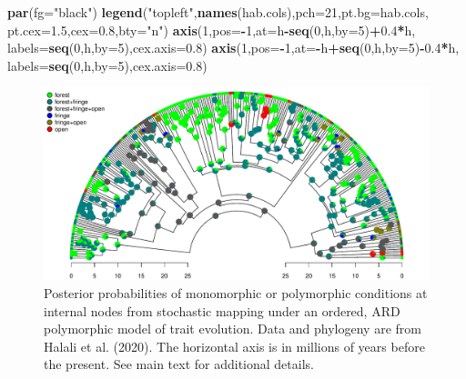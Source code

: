 \documentclass[fleqn,10pt,lineno]{wlpeerj} %
\newenvironment{Shaded}{\begin{snugshade}}{\end{snugshade}}
\newcommand{\AttributeTok}[1]{\textcolor[rgb]{0.13,0.29,0.53}{#1}}
\newcommand{\DecValTok}[1]{\textcolor[rgb]{0.00,0.00,0.81}{#1}}
\newcommand{\FloatTok}[1]{\textcolor[rgb]{0.00,0.00,0.81}{#1}}
\newcommand{\FunctionTok}[1]{\textcolor[rgb]{0.13,0.29,0.53}{\textbf{#1}}}
\newcommand{\NormalTok}[1]{#1}
\newcommand{\SpecialCharTok}[1]{\textcolor[rgb]{0.81,0.36,0.00}{\textbf{#1}}}
\newcommand{\StringTok}[1]{\textcolor[rgb]{0.31,0.60,0.02}{#1}}
\begin{document}
\begin{Shaded}
\begin{Highlighting}[]
\FunctionTok{par}\NormalTok{(}\AttributeTok{fg=}\StringTok{"black"}\NormalTok{)}
\FunctionTok{legend}\NormalTok{(}\StringTok{"topleft"}\NormalTok{,}\FunctionTok{names}\NormalTok{(hab.cols),}\AttributeTok{pch=}\DecValTok{21}\NormalTok{,}\AttributeTok{pt.bg=}\NormalTok{hab.cols,}
  \AttributeTok{pt.cex=}\FloatTok{1.5}\NormalTok{,}\AttributeTok{cex=}\FloatTok{0.8}\NormalTok{,}\AttributeTok{bty=}\StringTok{"n"}\NormalTok{)}
\FunctionTok{axis}\NormalTok{(}\DecValTok{1}\NormalTok{,}\AttributeTok{pos=}\SpecialCharTok{{-}}\DecValTok{1}\NormalTok{,}\AttributeTok{at=}\NormalTok{h}\SpecialCharTok{{-}}\FunctionTok{seq}\NormalTok{(}\DecValTok{0}\NormalTok{,h,}\AttributeTok{by=}\DecValTok{5}\NormalTok{)}\SpecialCharTok{+}\FloatTok{0.4}\SpecialCharTok{*}\NormalTok{h,}
  \AttributeTok{labels=}\FunctionTok{seq}\NormalTok{(}\DecValTok{0}\NormalTok{,h,}\AttributeTok{by=}\DecValTok{5}\NormalTok{),}\AttributeTok{cex.axis=}\FloatTok{0.8}\NormalTok{)}
\FunctionTok{axis}\NormalTok{(}\DecValTok{1}\NormalTok{,}\AttributeTok{pos=}\SpecialCharTok{{-}}\DecValTok{1}\NormalTok{,}\AttributeTok{at=}\SpecialCharTok{{-}}\NormalTok{h}\SpecialCharTok{+}\FunctionTok{seq}\NormalTok{(}\DecValTok{0}\NormalTok{,h,}\AttributeTok{by=}\DecValTok{5}\NormalTok{)}\SpecialCharTok{{-}}\FloatTok{0.4}\SpecialCharTok{*}\NormalTok{h,}
  \AttributeTok{labels=}\FunctionTok{seq}\NormalTok{(}\DecValTok{0}\NormalTok{,h,}\AttributeTok{by=}\DecValTok{5}\NormalTok{),}\AttributeTok{cex.axis=}\FloatTok{0.8}\NormalTok{)}
\end{Highlighting}
\end{Shaded}

\begin{figure}
\includegraphics[width=1\linewidth]{Revell.phytools-v2_peerj_files/figure-latex/fig07-anc-fitpolyMk-1} \caption{Posterior probabilities of monomorphic or polymorphic conditions at internal nodes from stochastic mapping under an ordered, ARD polymorphic model of trait evolution. Data and phylogeny are from Halali et al. (2020).  The horizontal axis is in millions of years before the present. See main text for additional details.}\label{fig:fig07-anc-fitpolyMk}
\end{figure}
\end{document}
